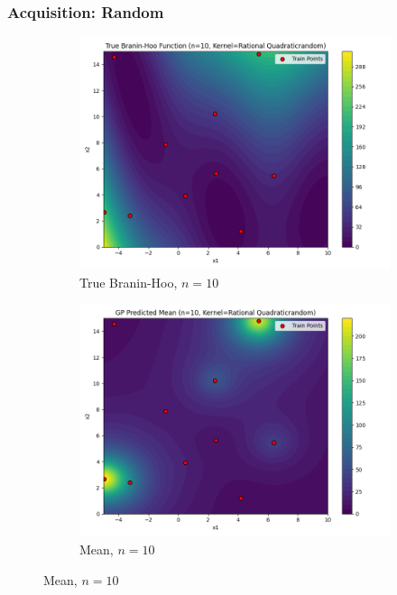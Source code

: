 \documentclass[a4paper,12pt]{article}
\begin{document}
\subsubsection*{Acquisition: Random}
\begin{figure}[H]
\centering
\begin{subfigure}{0.3\textwidth}
  \includegraphics[width=\linewidth]{Task-02/images/true_function_rational_quadratic_n10_random.png}
  \caption{True Branin-Hoo, $n=10$}
\end{subfigure}
\begin{subfigure}{0.3\textwidth}
    \includegraphics[width=\linewidth]{Task-02/images/gp_mean_rational_quadratic_n10_random.png}
    \caption{Mean, $n=10$}
\end{subfigure}

\end{figure}
\end{document}
